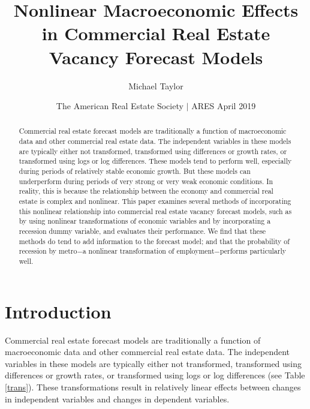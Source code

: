 \documentclass[10pt]{article}
\title{Nonlinear Macroeconomic Effects in Commercial Real Estate Vacancy Forecast Models}
\author{Michael Taylor}
\date{The American Real Estate Society $|$ ARES April 2019}
\begin{document}
\maketitle


\begin{abstract}
Commercial real estate forecast models are traditionally a function of macroeconomic data and other commercial real estate data.  The independent variables in these models are typically either not transformed, transformed using differences or growth rates, or transformed using logs or log differences.  These models tend to perform well, especially during periods of relatively stable economic growth.  But these models can underperform during periods of very strong or very weak economic conditions.  In reality, this is because the relationship between the economy and commercial real estate is complex and nonlinear.  This paper examines several methods of incorporating this nonlinear relationship into commercial real estate vacancy forecast models, such as by using nonlinear transformations of economic variables and by incorporating a recession dummy variable, and evaluates their performance.  We find that these methods do tend to add information to the forecast model; and that the probability of recession by metro$-$a nonlinear transformation of employment$-$performs particularly well.
\end{abstract}

\section*{Introduction}
Commercial real estate forecast models are traditionally a function of macroeconomic data and other commercial real estate data.  The independent variables in these models are typically either not transformed, transformed using differences or growth rates, or transformed using logs or log differences (see Table \ref{trans}).  These transformations result in relatively linear effects between changes in independent variables and changes in dependent variables.
\end{document}
